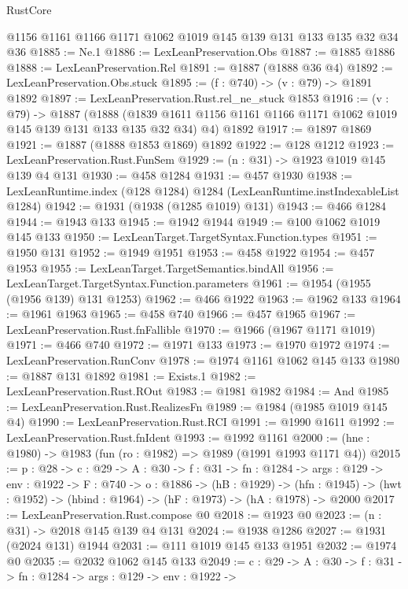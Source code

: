 \begin{lexlean}{RustCore}
\begin{coremodule}
    @1156
    @1161
    @1166
    @1171
    @1062
    @1019
    @145
    @139
    @131
    @133
    @135
    @32
    @34
    @36
@1885 := Ne.{1}
@1886 := LexLeanPreservation.Obs
@1887 := @1885 @1886
@1888 := LexLeanPreservation.Rel
@1891 := @1887 (@1888 @36 @4)
@1892 := LexLeanPreservation.Obs.stuck
@1895 := (f : @740) -> (v : @79) -> @1891 @1892
@1897 := LexLeanPreservation.Rust.rel_ne_stuck @1853
@1916 := (v : @79) ->
  @1887
    (@1888 (@1839 @1611 @1156 @1161 @1166 @1171 @1062 @1019 @145 @139 @131 @133 @135 @32 @34) @4)
    @1892
@1917 := @1897 @1869
@1921 := @1887 (@1888 @1853 @1869) @1892
@1922 := @128 @1212
@1923 := LexLeanPreservation.Rust.FunSem
@1929 := (n : @31) -> @1923 @1019 @145 @139 @4 @131
@1930 := @458 @1284
@1931 := @457 @1930
@1938 := LexLeanRuntime.index (@128 @1284) @1284 (LexLeanRuntime.instIndexableList @1284)
@1942 := @1931 (@1938 (@1285 @1019) @131)
@1943 := @466 @1284
@1944 := @1943 @133
@1945 := @1942 @1944
@1949 := @100 @1062 @1019 @145 @133
@1950 := LexLeanTarget.TargetSyntax.Function.types
@1951 := @1950 @131
@1952 := @1949 @1951
@1953 := @458 @1922
@1954 := @457 @1953
@1955 := LexLeanTarget.TargetSemantics.bindAll
@1956 := LexLeanTarget.TargetSyntax.Function.parameters
@1961 := @1954 (@1955 (@1956 @139) @131 @1253)
@1962 := @466 @1922
@1963 := @1962 @133
@1964 := @1961 @1963
@1965 := @458 @740
@1966 := @457 @1965
@1967 := LexLeanPreservation.Rust.fnFallible
@1970 := @1966 (@1967 @1171 @1019)
@1971 := @466 @740
@1972 := @1971 @133
@1973 := @1970 @1972
@1974 := LexLeanPreservation.RunConv
@1978 := @1974 @1161 @1062 @145 @133
@1980 := @1887 @131 @1892
@1981 := Exists.{1}
@1982 := LexLeanPreservation.Rust.ROut
@1983 := @1981 @1982
@1984 := And
@1985 := LexLeanPreservation.Rust.RealizesFn
@1989 := @1984 (@1985 @1019 @145 @4)
@1990 := LexLeanPreservation.Rust.RCI
@1991 := @1990 @1611
@1992 := LexLeanPreservation.Rust.fnIdent
@1993 := @1992 @1161
@2000 := (hne : @1980) -> @1983 (fun (ro : @1982) => @1989 (@1991 @1993 @1171 @4))
@2015 := {p : @28} ->
  {c : @29} ->
  {A : @30} ->
  {f : @31} ->
  {fn : @1284} ->
  {args : @129} ->
  {env : @1922} ->
  {F : @740} ->
  {o : @1886} ->
  (hB : @1929) ->
  (hfn : @1945) -> (hwt : @1952) -> (hbind : @1964) -> (hF : @1973) -> (hA : @1978) -> @2000
@2017 := LexLeanPreservation.Rust.compose @0
@2018 := @1923 @0
@2023 := (n : @31) -> @2018 @145 @139 @4 @131
@2024 := @1938 @1286
@2027 := @1931 (@2024 @131) @1944
@2031 := @111 @1019 @145 @133 @1951
@2032 := @1974 @0
@2035 := @2032 @1062 @145 @133
@2049 := {c : @29} ->
  {A : @30} ->
  {f : @31} ->
  {fn : @1284} ->
  {args : @129} ->
  {env : @1922} ->

\end{coremodule}
\end{lexlean}

